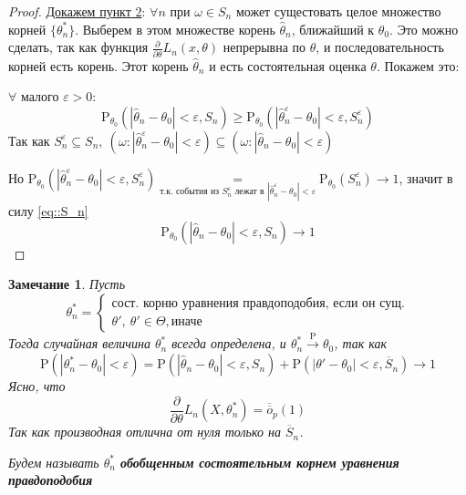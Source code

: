 \documentclass[12pt]{article}
\newtheorem{remark}{Замечание}
\theoremstyle{basic_theorem}
\theoremstyle{name_theorem}
\newcommand\defin[1]{\textbf{#1}}
\def\eps{ \varepsilon }
\def\P{ \mathrm{P} }
\def\littleO{ \overline{\overline{o}} }
\begin{document}
\begin{proof}
        \underline{Докажем пункт 2}: \(\forall n\) при \(\omega\in S_n\) может сущестовать целое множество корней
        \(\{\theta^*_n\}\). Выберем в этом множестве корень \(\widehat{\theta}_n\),
        ближайший к \(\theta_0\). Это можно сделать, так как
        функция \(\frac{\partial}{\partial\theta} L_n(x, \theta)\) непрерывна по \(\theta\),
        и последовательность корней есть корень. Этот корень \(\widehat{\theta}_n\)
        и есть состоятельная оценка \(\theta\). Покажем это:

        \(\forall \text{ малого } \eps > 0\):
        \begin{equation}
            \label{eq::S_n}
            \P_{\theta_0}(\left\lvert \widehat{\theta}_n - \theta_0 \right\rvert  < \eps, S_n) \geq
            \P_{\theta_0}(\left\lvert \widehat{\theta}^\eps_n - \theta_0 \right\rvert  < \eps, S_n^\eps)
        \end{equation}
        Так как $S^\eps_n \subseteq S_n,\
        (\omega: \left\lvert \widehat{\theta}^\eps_n - \theta_0 \right\rvert  < \eps) \subseteq
        (\omega: \left\lvert \widehat{\theta}_n - \theta_0 \right\rvert  < \eps)$

        Но $\P_{\theta_0}(\left\lvert \widehat{\theta}^\eps_n - \theta_0 \right\rvert  < \eps, S^\eps_n)
        \underset{\text{т.к. события из } S_n^\eps \text{ лежат в } \left\lvert \widehat{\theta}^\eps_n - \theta_0 \right\rvert  < \eps}{=}
        \P_{\theta_0}(S_n^\eps) \rightarrow 1$, значит в силу \eqref{eq::S_n}
        \[\P_{\theta_0} (\left\lvert \widehat{\theta}_n - \theta_0 \right\rvert  < \eps, S_n) \rightarrow 1\]
    \end{proof}

    \begin{remark}
        Пусть
        \[\theta^*_n = \begin{cases}
            \text{сост. корню уравнения правдоподобия, если он сущ.} \\
            \theta',\ \theta'\in\Theta, \text{иначе}
        \end{cases}\]
        Тогда случайная величина \(\theta^*_n\) всегда определена, и
        \(\theta^*_n \xrightarrow{\P} \theta_0\), так как
        \[\P(\left\lvert \theta^*_n - \theta_0 \right\rvert  < \eps) =
        \P(\left\lvert \widehat{\theta}_n - \theta_0 \right\rvert  < \eps, S_n) +
        \P(\left\lvert \theta' - \theta_0 \right\rvert  < \eps, \overline{S}_n) \rightarrow 1\]
        Ясно, что
        \begin{equation}
            \frac{\partial}{\partial\theta} L_n(X, \theta^*_n) = \littleO_p(1)
        \end{equation}
        Так как производная отлична от нуля только на \(\overline{S}_n\).

        Будем называть \(\theta_n^*\) \defin{обобщенным состоятельным корнем уравнения
        правдоподобия}
    \end{remark}
\end{document}
